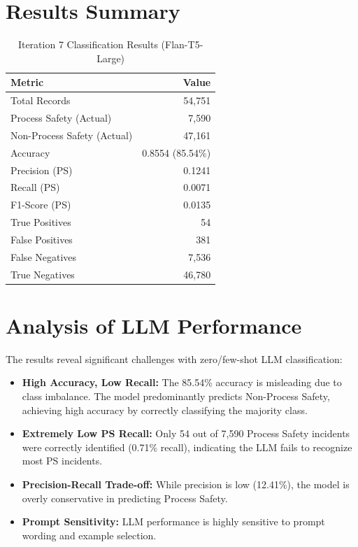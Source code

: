 \documentclass[11pt, titlepage, bibliography=totoc]{scrreprt}
\begin{document}
\section{Results Summary}

\begin{table}[htbp]
\centering
\caption{Iteration 7 Classification Results (Flan-T5-Large)}
\label{tab:iter7-results}
\begin{tabular}{@{}lr@{}}
\toprule
\textbf{Metric} & \textbf{Value} \\
\midrule
Total Records & 54,751 \\
Process Safety (Actual) & 7,590 \\
Non-Process Safety (Actual) & 47,161 \\
\midrule
Accuracy & 0.8554 (85.54\%) \\
Precision (PS) & 0.1241 \\
Recall (PS) & 0.0071 \\
F1-Score (PS) & 0.0135 \\
\midrule
True Positives & 54 \\
False Positives & 381 \\
False Negatives & 7,536 \\
True Negatives & 46,780 \\
\bottomrule
\end{tabular}
\end{table}

\section{Analysis of LLM Performance}

The results reveal significant challenges with zero/few-shot LLM classification:

\begin{itemize}
    \item \textbf{High Accuracy, Low Recall:} The 85.54\% accuracy is misleading due to class imbalance. The model predominantly predicts Non-Process Safety, achieving high accuracy by correctly classifying the majority class.
    
    \item \textbf{Extremely Low PS Recall:} Only 54 out of 7,590 Process Safety incidents were correctly identified (0.71\% recall), indicating the LLM fails to recognize most PS incidents.
    
    \item \textbf{Precision-Recall Trade-off:} While precision is low (12.41\%), the model is overly conservative in predicting Process Safety.
    
    \item \textbf{Prompt Sensitivity:} LLM performance is highly sensitive to prompt wording and example selection.
\end{itemize}
\end{document}
